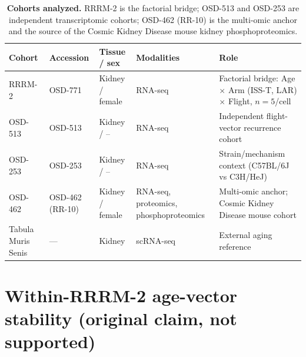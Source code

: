\documentclass[10pt]{article}
\begin{document}
\begin{table}[H]
\centering\footnotesize
\caption{\textbf{Cohorts analyzed.} RRRM-2 is the factorial bridge; OSD-513 and OSD-253 are independent transcriptomic cohorts; OSD-462 (RR-10) is the multi-omic anchor and the source of the Cosmic Kidney Disease mouse kidney phosphoproteomics.}
\label{tab:cohorts}
\begin{tabularx}{\textwidth}{>{\raggedright\arraybackslash}p{} >{\raggedright\arraybackslash}p{} >{\raggedright\arraybackslash}p{} >{\raggedright\arraybackslash}p{} X}
\toprule
Cohort & Accession & Tissue / sex & Modalities & Role \\
\midrule
RRRM-2 & OSD-771 & Kidney / female & RNA-seq & Factorial bridge: Age $\times$ Arm (ISS-T, LAR) $\times$ Flight, $n=5$/cell \\
OSD-513 & OSD-513 & Kidney / -- & RNA-seq & Independent flight-vector recurrence cohort \\
OSD-253 & OSD-253 & Kidney / -- & RNA-seq & Strain/mechanism context (C57BL/6J vs C3H/HeJ) \\
OSD-462 & OSD-462 (RR-10) & Kidney / female & RNA-seq, proteomics, phosphoproteomics & Multi-omic anchor; Cosmic Kidney Disease mouse cohort \\
Tabula Muris Senis & --- & Kidney & scRNA-seq & External aging reference \\
\bottomrule
\end{tabularx}
\end{table}

\section{Within-RRRM-2 age-vector stability (original claim, not supported)}
\end{document}
